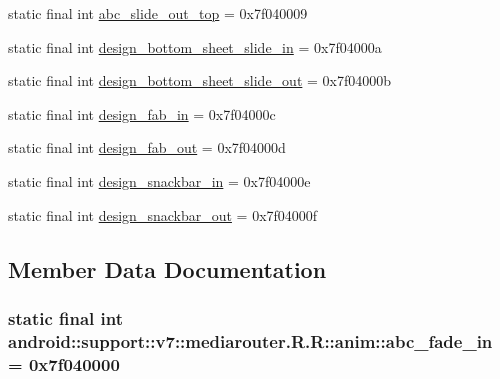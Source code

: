 \begin{CompactItemize}
\item 
static final int \hyperlink{classandroid_1_1support_1_1v7_1_1mediarouter_1_1_r_1_1anim_6ac5ec9dbbed4db8d0f618fdde486b4c}{abc\_\-slide\_\-out\_\-top} = 0x7f040009
\item 
static final int \hyperlink{classandroid_1_1support_1_1v7_1_1mediarouter_1_1_r_1_1anim_a9b3cc20d06261ae29e124cb3eb65ad3}{design\_\-bottom\_\-sheet\_\-slide\_\-in} = 0x7f04000a
\item 
static final int \hyperlink{classandroid_1_1support_1_1v7_1_1mediarouter_1_1_r_1_1anim_cf5676e1f44d4011e74389a79a9fe531}{design\_\-bottom\_\-sheet\_\-slide\_\-out} = 0x7f04000b
\item 
static final int \hyperlink{classandroid_1_1support_1_1v7_1_1mediarouter_1_1_r_1_1anim_8597d7fbabee08a09cacbc2dfecd4556}{design\_\-fab\_\-in} = 0x7f04000c
\item 
static final int \hyperlink{classandroid_1_1support_1_1v7_1_1mediarouter_1_1_r_1_1anim_fd2cede7a1d6d8a669267ba4fff823c8}{design\_\-fab\_\-out} = 0x7f04000d
\item 
static final int \hyperlink{classandroid_1_1support_1_1v7_1_1mediarouter_1_1_r_1_1anim_8c16bb7f0ff5765ea9d4b00072f94661}{design\_\-snackbar\_\-in} = 0x7f04000e
\item 
static final int \hyperlink{classandroid_1_1support_1_1v7_1_1mediarouter_1_1_r_1_1anim_3f46122771e0bb8970589c457197af3c}{design\_\-snackbar\_\-out} = 0x7f04000f
\end{CompactItemize}


\subsection{Member Data Documentation}
\hypertarget{classandroid_1_1support_1_1v7_1_1mediarouter_1_1_r_1_1anim_500904d737221f2e3ec179fef874bb48}{
\subsubsection[{abc\_\-fade\_\-in}]{\setlength{\rightskip}{0pt plus 5cm}static final int android::support::v7::mediarouter.R.R::anim::abc\_\-fade\_\-in = 0x7f040000}}
\label{classandroid_1_1support_1_1v7_1_1mediarouter_1_1_r_1_1anim_500904d737221f2e3ec179fef874bb48}



